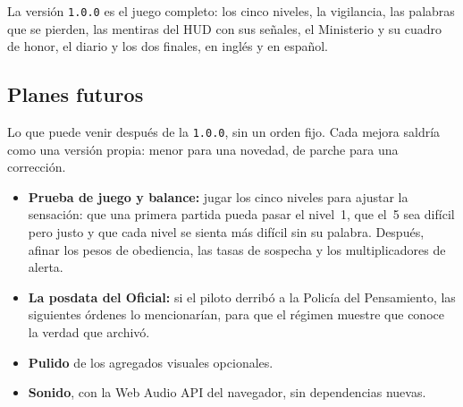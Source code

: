 \documentclass[11pt,a4paper]{article}
\begin{document}
La versión \texttt{1.0.0} es el juego completo: los cinco niveles, la vigilancia, las palabras que se pierden, las mentiras del HUD con sus señales, el Ministerio y su cuadro de honor, el diario y los dos finales, en inglés y en español.

\subsection{Planes futuros}

Lo que puede venir después de la \texttt{1.0.0}, sin un orden fijo. Cada mejora saldría como una versión propia: menor para una novedad, de parche para una corrección.

\begin{itemize}
  \item \textbf{Prueba de juego y balance:} jugar los cinco niveles para ajustar la sensación: que una primera partida pueda pasar el nivel~1, que el~5 sea difícil pero justo y que cada nivel se sienta más difícil sin su palabra. Después, afinar los pesos de obediencia, las tasas de sospecha y los multiplicadores de alerta.
  \item \textbf{La posdata del Oficial:} si el piloto derribó a la Policía del Pensamiento, las siguientes órdenes lo mencionarían, para que el régimen muestre que conoce la verdad que archivó.
  \item \textbf{Pulido} de los agregados visuales opcionales.
  \item \textbf{Sonido}, con la Web Audio API del navegador, sin dependencias nuevas.
\end{itemize}
\end{document}
